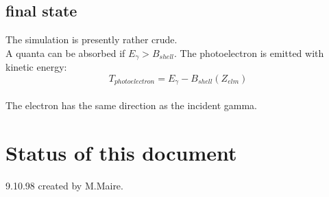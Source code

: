 \subsection{final state}
The simulation is presently rather crude.             \\
A quanta can be absorbed if $E_{\gamma} > B_{shell}$.
The photoelectron is emitted with kinetic energy:
\[T_{photoelectron} = E_{\gamma}-B_{shell}(Z_{elm})\]
\\ 
The electron has the same direction as the incident gamma.
\section{Status of this document}
 9.10.98  created by M.Maire.
